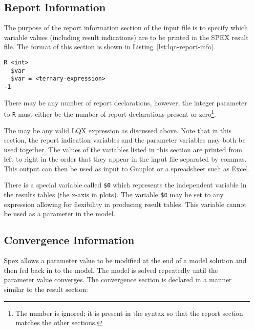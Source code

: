 \label{sec:spex-variables|)}

\subsection{Report Information}
\label{sec:lqn-report-information}

The purpose of the report information section of the input file is to specify which variable values
(including result indications) are to be printed in the SPEX result file.  The format of this section is
shown in Listing~\ref{lst:lqn-report-info}.

\lstset{language=LQN,basicstyle=\ttfamily,numbersep=10pt,firstnumber=1}
\begin{lstlisting}[caption={Report Information},label=lst:lqn-report-info,frame=single,float]
R <int>
  $var
  $var = <ternary-expression>
-1
\end{lstlisting}

There may be any number of report declarations, however, the integer parameter to \texttt{R} must either be
the number of report declarations present or zero\footnote{The number is ignored; it is present in the
syntax so that the report section matches the other sections.}.

The  may be any valid LQX expression as discussed above.  Note that in this section,
the report indication variables and the parameter
variables may both be used together.  The values of the variables listed in this
section are printed from left to right in the order that they appear in the input file separated by commas.
This output can then be used as input to Gnuplot or a spreadsheet such as Excel.

There is a special variable called \texttt{\$0} which represents the independent variable in the
results tables (the x-axis in plots).  The variable \texttt{\$0} may be set to any expression allowing for
flexibility in producing result tables.  This variable cannot be used as a parameter in the model.

\subsection{Convergence Information}
\label{sec:lqn-convergence-information}

Spex allows a parameter value to be modified at the end of a model solution and
then fed back in to the model.  The model is solved repeatedly until the parameter
value converges.  The convergence section is declared in a manner similar to the
result section:

